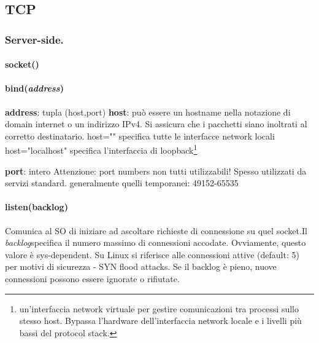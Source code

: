 \subsection{TCP}

\begin{minipage}[t]{0.45\textwidth}

\subsubsection{Server-side.}
\paragraph{socket()}
\paragraph{bind(\textit{address})}
\textbf{address}: tupla (host,port) 
\textbf{host}: può essere un hostname nella notazione di domain internet o un indirizzo IPv4.
Si assicura che i pacchetti siano inoltrati al corretto destinatario.
host="" specifica tutte le interfacce network locali
host="localhost" specifica l'interfaccia di loopback\footnote{un'interfaccia network virtuale per gestire comunicazioni tra processi sullo stesso host. Bypassa l'hardware dell'interfaccia network locale e i livelli più bassi del protocol stack. 
}

\textbf{port}: intero
Attenzione: port numbers non tutti utilizzabili! Spesso utilizzati da servizi standard.
generalmente quelli temporanei: 49152-65535
	
\paragraph{listen(backlog)}
Comunica al SO di iniziare ad ascoltare richieste di connessione su quel socket.Il \textit{backlog}specifica il numero massimo di connessioni accodate. Ovviamente, questo valore è sys-dependent. Su Linux si riferisce alle connessioni attive (default: 5) per motivi di sicurezza - SYN flood attacks. Se il backlog è pieno, nuove connessioni possono essere ignorate o rifiutate.


\end{minipage}

